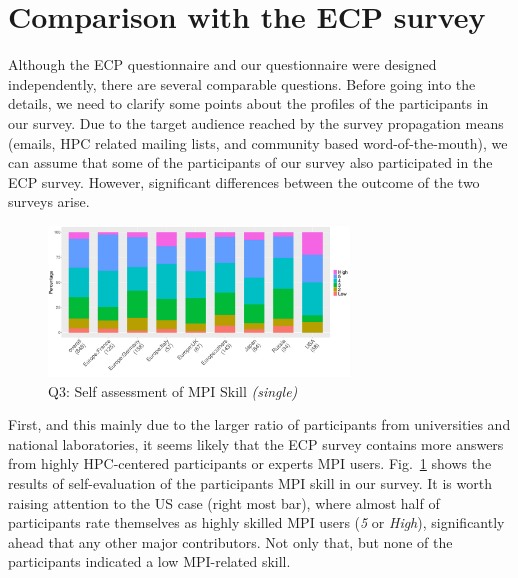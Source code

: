 \documentclass[preprint,5p,times]{elsarticle}
\def\myquote#1{{\it #1}}
\def\mcountries{major contributors\xspace{}}%
\begin{document}
\section{Comparison with the ECP survey}\label{sec:ecp}

Although the ECP questionnaire and our questionnaire were designed
independently, there are several comparable questions. Before going into the
details, we need to clarify some points about the profiles of the participants
in our survey.
%
Due to the target audience reached by the survey propagation means (emails, HPC
related mailing lists, and community based word-of-the-mouth), we can assume
that some of the participants of our survey also participated in the ECP survey.
However, significant differences between the outcome of the two surveys arise.

\begin{figure}[htb]
  \begin{center}
    \includegraphics[width=8.0cm]{R-scripts/Q3.pdf}
    \vspace{-2mm}
    \caption{Q3: Self assessment of MPI Skill {\it(single)}}
    \label{fig:mpi-skill}
  \end{center}
\end{figure}

First, and this mainly due to the larger ratio of participants from universities
and national laboratories, it seems likely that the ECP survey contains more
answers from highly HPC-centered participants or experts MPI users.
Fig.~\ref{fig:mpi-skill} shows the results of self-evaluation of the
participants MPI skill in our survey.  It is worth raising attention to the US
case (right most bar), where almost half of participants rate themselves as
highly skilled MPI users (\myquote{5} or \myquote{High}), significantly ahead
that any other \mcountries. Not only that, but none of the participants
indicated a low MPI-related skill.
\end{document}
